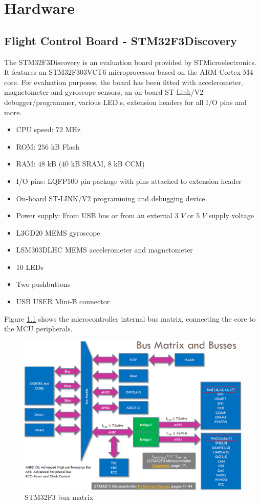 \documentclass[a4paper]{report}
\begin{document}
\chapter{Hardware}

	\section{Flight Control Board - STM32F3Discovery}
The STM32F3Discovery is an evaluation board provided by STMicroelectronics. It features an STM32F303VCT6 microprocessor based on the ARM Cortex-M4 core. For evaluation purposes, the board has been fitted with accelerometer, magnetometer and gyroscope sensors, an on-board ST-Link/V2 debugger/programmer, various LED:s, extension headers for all I/O pins and more.

\begin{itemize}
  \item CPU speed: $72$ MHz
  \item ROM: $256$ kB Flash
  \item RAM: $48$ kB ($40$ kB SRAM, $8$ kB CCM)
  \item I/O pins: LQFP100 pin package with pins attached to extension header
  \item On-board ST-LINK/V2 programming and debugging device
  \item Power supply: From USB bus or from an external $3$ $V$ or $5$ $V$ supply voltage
  \item L3GD20 MEMS gyroscope
  \item LSM303DLHC MEMS accelerometer and magnetometer
  \item 10 LEDs
  \item Two pushbuttons
  \item USB USER Mini-B connector
\end{itemize}

Figure \ref{fig:stm32f3busmatrix} shows the microcontroller internal bus matrix, connecting the core to the MCU peripherals.

\begin{figure}[h]
    \centering
    \includegraphics[scale=0.4]{images/stm32_busmatrix.png}
    \caption{STM32F3 bux matrix}
    \label{fig:stm32f3busmatrix}
\end{figure}
\end{document}
